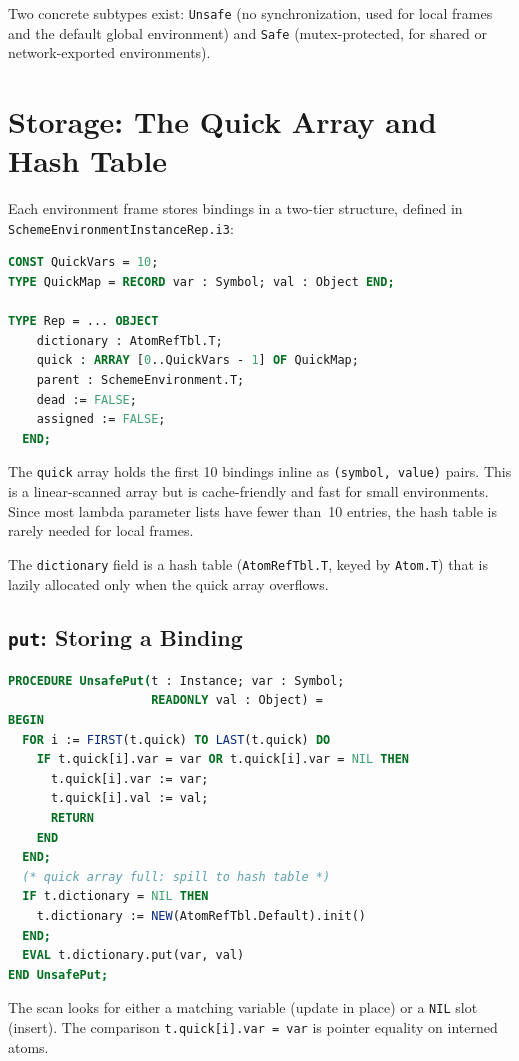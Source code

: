 \documentclass[12pt]{report}
\begin{document}
Two concrete subtypes exist: \texttt{Unsafe} (no synchronization, used
for local frames and the default global environment) and \texttt{Safe}
(mutex-protected, for shared or network-exported environments).

\section{Storage: The Quick Array and Hash Table}
\label{sec:quickarray}

Each environment frame stores bindings in a two-tier structure, defined
in \texttt{SchemeEnvironmentInstanceRep.i3}:

\begin{lstlisting}[language=Modula3]
CONST QuickVars = 10;
TYPE QuickMap = RECORD var : Symbol; val : Object END;

TYPE Rep = ... OBJECT
    dictionary : AtomRefTbl.T;
    quick : ARRAY [0..QuickVars - 1] OF QuickMap;
    parent : SchemeEnvironment.T;
    dead := FALSE;
    assigned := FALSE;
  END;
\end{lstlisting}

The \texttt{quick} array holds the first 10 bindings inline as
\texttt{(symbol, value)} pairs.  This is a linear-scanned array
but is cache-friendly and fast for small environments.  Since most
lambda parameter lists have fewer than~10 entries, the hash table
is rarely needed for local frames.

The \texttt{dictionary} field is a hash table (\texttt{AtomRefTbl.T},
keyed by \texttt{Atom.T}) that is lazily allocated only when the quick
array overflows.

\subsection{\texttt{put}: Storing a Binding}

\begin{lstlisting}[language=Modula3]
PROCEDURE UnsafePut(t : Instance; var : Symbol;
                    READONLY val : Object) =
BEGIN
  FOR i := FIRST(t.quick) TO LAST(t.quick) DO
    IF t.quick[i].var = var OR t.quick[i].var = NIL THEN
      t.quick[i].var := var;
      t.quick[i].val := val;
      RETURN
    END
  END;
  (* quick array full: spill to hash table *)
  IF t.dictionary = NIL THEN
    t.dictionary := NEW(AtomRefTbl.Default).init()
  END;
  EVAL t.dictionary.put(var, val)
END UnsafePut;
\end{lstlisting}

The scan looks for either a matching variable (update in place) or a
\texttt{NIL} slot (insert).  The comparison \texttt{t.quick[i].var = var}
is pointer equality on interned atoms.
\end{document}
